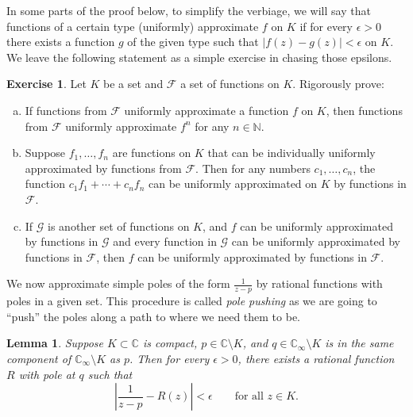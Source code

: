\documentclass[12pt,openany]{book}
\newcommand{\sabs}[1]{\lvert {#1} \rvert}
\newcommand{\abs}[1]{\left\lvert {#1} \right\rvert}
\newcommand{\C}{{\mathbb{C}}}
\newcommand{\N}{{\mathbb{N}}}
\newcommand{\sF}{{\mathscr{F}}}
\newcommand{\sG}{{\mathscr{G}}}
\newcommand{\myindex}[1]{#1\index{#1}}
\newcommand{\myquote}[1]{``#1''}
\theoremstyle{plain}
\newtheorem{lemma}[thm]{Lemma}
\theoremstyle{remark}
\theoremstyle{definition}
\newenvironment{exbox}{%
    \def\FrameCommand{\vrule width 1pt \relax\hspace{10pt}}%
    \MakeFramed{\advance\hsize-\width\FrameRestore}%
}{%
    \endMakeFramed
}
\newenvironment{exparts}{%
    \leavevmode\begin{enumerate}[a),noitemsep,topsep=0pt,parsep=0pt,partopsep=0pt]
}{%
    \end{enumerate}
}
\theoremstyle{exercise}
\newtheorem{exercise}{Exercise}[section]
\theoremstyle{example}
\begin{document}
In some parts of the proof below, to simplify the verbiage, we will say that
functions of a certain type (uniformly) approximate $f$ on $K$
if for every $\epsilon > 0$ there exists a function $g$
of the given type such that
$\sabs{f(z)-g(z)} < \epsilon$ on $K$.  We leave the following statement as
a simple exercise in chasing those epsilons.

\begin{exbox}
\begin{exercise} \label{exercise:approxbyfamily}
Let $K$ be a set and $\sF$ a set of functions on $K$.  Rigorously prove:
\begin{exparts}
\item
If functions from $\sF$ uniformly approximate a function $f$ on $K$,
then functions from $\sF$ uniformly approximate $f^n$ for any $n \in \N$.
\item
Suppose
$f_1,\ldots,f_n$ are functions on $K$ that can be individually
uniformly approximated
by functions from $\sF$.  Then for any numbers $c_1,\ldots,c_n$, the
function $c_1 f_1 + \cdots + c_n f_n$ can be uniformly approximated on $K$
by functions in $\sF$.
\item
If $\sG$ is another set of functions on $K$, and
$f$ can be uniformly approximated by functions in $\sG$
and every function in $\sG$ can be uniformly approximated by functions in
$\sF$, then $f$ can be uniformly approximated by functions in $\sF$.
\end{exparts}
\end{exercise}
\end{exbox}

We now approximate simple poles of the form $\frac{1}{z-p}$ by rational
functions with poles in a given set.  This procedure is called
\emph{\myindex{pole pushing}} as we are going to \myquote{push} the poles along a
path to where we need them to be.

\begin{lemma} \label{lemma:polepushing}
Suppose $K \subset \C$ is compact,
$p \in \C \setminus K$, and
$q \in \C_{\infty} \setminus K$ is
in the same component of $\C_{\infty} \setminus K$ as $p$.
Then for every $\epsilon > 0$,
there exists a rational function $R$ with pole at $q$ such that
\begin{equation*}
\abs{\frac{1}{z-p}-R(z)} < \epsilon \qquad \text{for all $z \in K$.}
\end{equation*}
\end{lemma}
\end{document}
